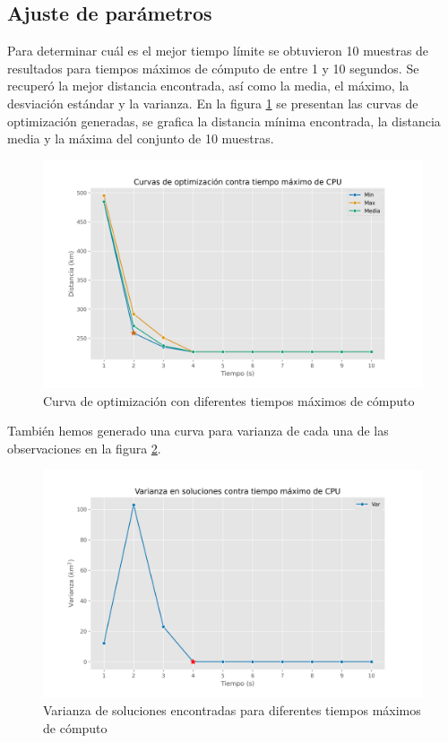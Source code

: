 \documentclass[journal]{IEEEtran}
\begin{document}
        \subsection{Ajuste de parámetros} \label{sec:parameter-tuning}
            
            Para determinar cuál es el mejor tiempo límite se obtuvieron 10 muestras de resultados para tiempos máximos de cómputo de entre 1 y 10 segundos. Se recuperó la mejor distancia encontrada, así como la media, el máximo, la desviación estándar y la varianza. En la figura \ref{fig:optim-curves} se presentan las curvas de optimización generadas, se grafica la distancia mínima encontrada, la distancia media y la máxima del conjunto de 10 muestras.
            \begin{figure}[h!]
                \centering
                \includegraphics[scale=0.35]{../img/curvas-opt.png}
                \caption{Curva de optimización con diferentes tiempos máximos de cómputo}
                \label{fig:optim-curves}
            \end{figure}

            También hemos generado una curva para varianza de cada una de las observaciones en la figura \ref{fig:optim-var}.

            \begin{figure}[h!]
                \centering
                \includegraphics[scale=0.35]{../img/varianza-opt.png}
                \caption{Varianza de soluciones encontradas para diferentes tiempos máximos de cómputo}
                \label{fig:optim-var}
            \end{figure}
\end{document}

